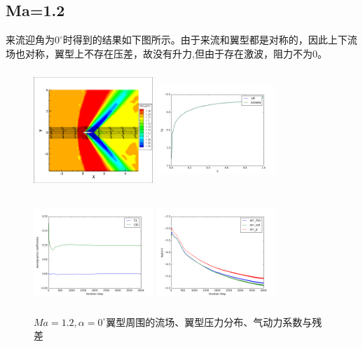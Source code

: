 \documentclass[UTF8]{ctexart}
\begin{document}
\subsection{Ma=1.2}
来流迎角为$0^\circ$时得到的结果如下图所示。由于来流和翼型都是对称的，因此上下流场也对称，翼型上不存在压差，故没有升力,但由于存在激波，阻力不为0。
\begin{figure}[H]\centering
  \begin{minipage}{5cm}
    \centering
    \includegraphics[height=4.5cm,width=4.5cm]{../pic/1.2_0_flowfield.png}
  \end{minipage}%
  \begin{minipage}{5cm}
    \centering
    \includegraphics[height=4.5cm,width=4.5cm]{../pic/1.2_0_Cp.png}
  \end{minipage}

  \begin{minipage}{5cm}
    \centering
    \includegraphics[height=4.5cm,width=4.5cm]{../pic/1.2_0_cl_cd.png}
  \end{minipage}%
  \begin{minipage}{5cm}
    \centering
    \includegraphics[height=4.5cm,width=4.5cm]{../pic/1.2_0_residual.png}
  \end{minipage}
  \caption{$Ma=1.2,\alpha=0^\circ$翼型周围的流场、翼型压力分布、气动力系数与残差}
\end{figure}
\end{document}
